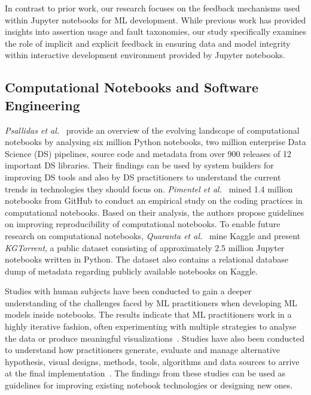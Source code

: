In contrast to prior work, our research focuses on the feedback mechanisms used within Jupyter notebooks for ML development. While previous work has provided insights into assertion usage and fault taxonomies, our study specifically examines the role of implicit and explicit feedback in ensuring data and model integrity within interactive development environment provided by Jupyter notebooks.

\subsection{Computational Notebooks and Software Engineering}\label{sec:notebooks}

\emph{Psallidas et al.}~\cite{psallidas2019data} provide an overview of the evolving landscape of computational notebooks by analysing six million Python notebooks, two million enterprise Data Science (DS) pipelines, source code and metadata from over 900 releases of 12 important DS libraries. Their findings can be used by system builders for improving DS tools and also by DS practitioners to understand the current trends in technologies they should focus on. \emph{Pimentel et al.}~\cite{pimentel2019large-scale} mined 1.4 million notebooks from GitHub to conduct an empirical study on the coding practices in computational notebooks. Based on their analysis, the authors propose guidelines on improving reproducibility of computational notebooks. To enable future research on computational notebooks, \emph{Quaranta et al.}~\cite{quaranta2021kgtorrent} mine Kaggle and present \textit{KGTorrent}, a public dataset consisting of approximately 2.5 million Jupyter notebooks written in Python. The dataset also contains a relational database dump of metadata regarding publicly available notebooks on Kaggle.

Studies with human subjects have been conducted to gain a deeper understanding of the challenges faced by ML practitioners when developing ML models inside notebooks. The results indicate that ML practitioners work in a highly iterative fashion, often experimenting with multiple strategies to analyse the data or produce meaningful visualizations~\cite{kandel2012enterprise,kery2018story,liu2019understanding,chattopadhyay2020whats}. Studies have also been conducted to understand how practitioners generate, evaluate and manage alternative hypothesis, visual designs, methods, tools, algorithms and data sources to arrive at the final implementation~\cite{liu2019understanding,kandel2012enterprise}. The findings from these studies can be used as guidelines for improving existing notebook technologies or designing new ones.

